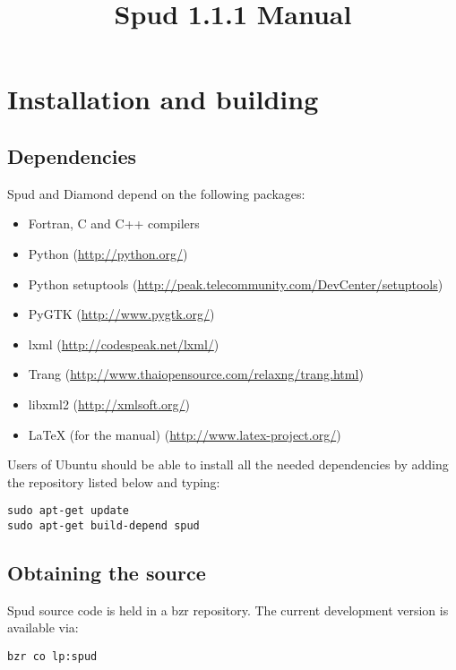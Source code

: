 \documentclass[a4paper, 11pt]{book}
\title{Spud 1.1.1 Manual}
\begin{document}
\maketitle

\tableofcontents


\chapter{Installation and building}

\section{Dependencies}

Spud and Diamond depend on the following packages:

\begin{itemize}
\item Fortran, C and C++ compilers
\item Python (\url{http://python.org/})
\item Python setuptools (\url{http://peak.telecommunity.com/DevCenter/setuptools})
\item PyGTK (\url{http://www.pygtk.org/})
\item lxml (\url{http://codespeak.net/lxml/})
\item Trang (\url{http://www.thaiopensource.com/relaxng/trang.html})
\item libxml2 (\url{http://xmlsoft.org/})
\item LaTeX (for the manual) (\url{http://www.latex-project.org/})
\end{itemize}

Users of Ubuntu should
be able to install all the needed dependencies by adding the repository listed below and typing:

\begin{verbatim}
sudo apt-get update
sudo apt-get build-depend spud
\end{verbatim}

\section{Obtaining the source}

Spud source code is held in a bzr repository. The current development version is available via:

\begin{verbatim}
bzr co lp:spud
\end{verbatim}
\end{document}
